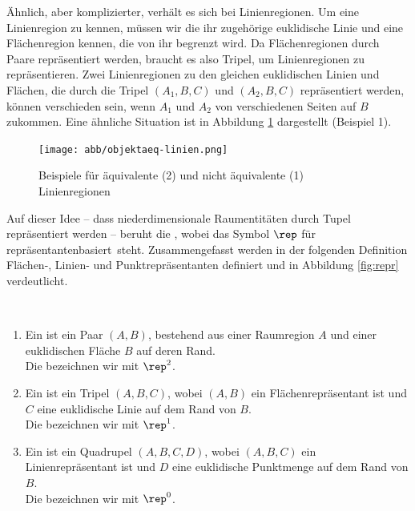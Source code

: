         Ähnlich, aber komplizierter, verhält es sich bei Linienregionen. 
        Um eine Linienregion zu kennen, müssen wir die ihr zugehörige euklidische Linie und eine Flächenregion kennen, die von ihr begrenzt wird. 
        Da Flächenregionen durch Paare repräsentiert werden, braucht es also Tripel, um Linienregionen zu repräsentieren.
        Zwei Linienregionen zu den gleichen euklidischen Linien und Flächen, die durch die Tripel $(A_1, B, C)$ und $(A_2, B, C)$ repräsentiert werden, können verschieden sein, wenn $A_1$ und $A_2$ von verschiedenen Seiten auf $B$ zukommen. 
        Eine ähnliche Situation ist in Abbildung \ref{fig:objektaeq-linien} dargestellt (Beispiel 1).
%
        \begin{figure}[ht]
            \centering
            \texttt{[image: abb/objektaeq-linien.png]}
            \caption{Beispiele für äquivalente (2) und nicht äquivalente (1) Linienregionen}
            \label{fig:objektaeq-linien}
        \end{figure}
%        
        Auf dieser Idee -- dass niederdimensionale Raumentitäten durch Tupel repräsentiert werden -- beruht die \strukt, wobei das Symbol $\rep$ für \glqq repräsentantenbasiert\grqq\ steht.
        Zusammengefasst werden in der folgenden Definition Flächen-, Linien- und Punktrepräsentanten definiert und in Abbildung \ref{fig:repr} verdeutlicht.
%
        \begin{dfn}[Repräsentanten]\ \vspace{0pt}
            \begin{enumerate}
                \item Ein  ist ein Paar $(A,B)$, 
                    bestehend aus einer Raumregion $A$ und einer euklidischen Fläche $B$ auf deren Rand.\\
                    Die  bezeichnen wir mit $\rep^2$.
                \item Ein  ist ein Tripel $(A,B,C)$, 
                    wobei $(A,B)$ ein Flächenrepräsentant ist und $C$ eine euklidische Linie auf dem Rand von $B$.\\
                    Die  bezeichnen wir mit $\rep^1$.
                \item Ein  ist ein Quadrupel $(A,B,C,D)$, 
                    wobei $(A,B,C)$ ein Linienrepräsentant ist und $D$ eine euklidische Punktmenge auf dem Rand von $B$.\\
                    Die  bezeichnen wir mit $\rep^0$.
            \end{enumerate}
        \end{dfn}
